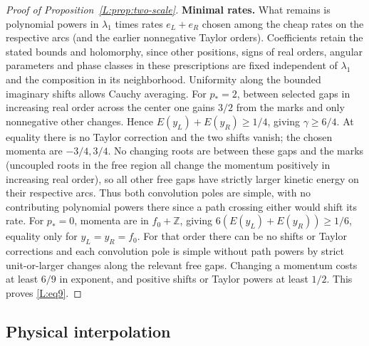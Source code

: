 \documentclass[11pt]{article}
\numberwithin{equation}{section}
\theoremstyle{definition}\newtheorem{definition}[theorem]{Definition}
\theoremstyle{remark}\newtheorem{remark}[theorem]{Remark}
\begin{document}
\begin{proof}[Proof of Proposition~\ref{L:prop:two-scale}]
\par\medskip\noindent\textbf{Minimal rates.}
What remains is polynomial powers in \(\lambda_1\) times rates \(e_L+e_R\) chosen among the cheap rates on the respective arcs (and the earlier nonnegative Taylor orders). Coefficients retain the stated bounds and holomorphy, since other positions, signs of real orders, angular parameters and phase classes in these prescriptions are fixed independent of \(\lambda_1\) and the composition in its neighborhood. Uniformity along the bounded imaginary shifts allows Cauchy averaging. For \(p_*=2\), between selected gaps in increasing real order across the center one gains \(3/2\) from the marks and only nonnegative other changes. Hence \(E(y_L)+E(y_R)\ge1/4\), giving \(\gamma\ge6/4\). At equality there is no Taylor correction and the two shifts vanish; the chosen momenta are \(-3/4,3/4\). No changing roots are between these gaps and the marks (uncoupled roots in the free region all change the momentum positively in increasing real order), so all other free gaps have strictly larger kinetic energy on their respective arcs. Thus both convolution poles are simple, with no contributing polynomial powers there since a path crossing either would shift its rate. For \(p_*=0\), momenta are in \(f_0+\mathbb Z\), giving \(6(E(y_L)+E(y_R))\ge1/6\), equality only for \(y_L=y_R=f_0\). For that order there can be no shifts or Taylor corrections and each convolution pole is simple without path powers by strict unit-or-larger changes along the relevant free gaps. Changing a momentum costs at least \(6/9\) in exponent, and positive shifts or Taylor powers at least \(1/2\). This proves \eqref{L:eq9}.


\end{proof}

\subsection{Physical interpolation}\label{L:step16}
\end{document}
